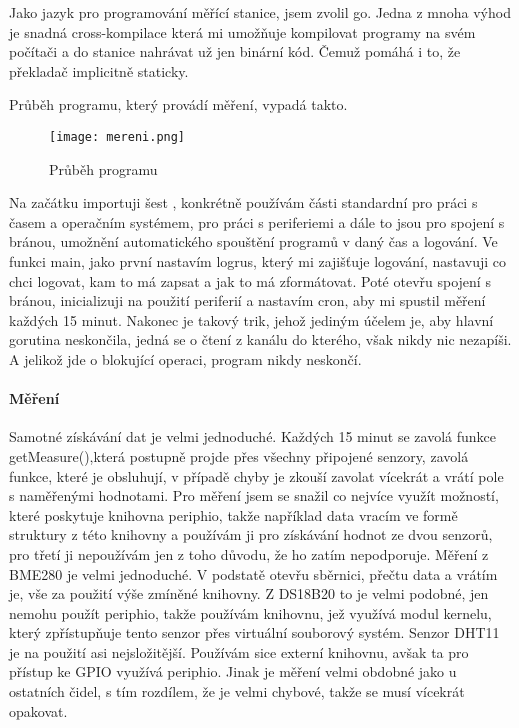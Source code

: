 Jako jazyk pro programování měřící stanice, jsem zvolil \gls{go}. Jedna z mnoha výhod je snadná \gls{cross-kompilace} 
která mi umožňuje kompilovat programy na svém počítači a do stanice nahrávat už jen binární kód. Čemuž pomáhá i to, že 
překladač implicitně  staticky.

Průběh programu, který provádí měření, vypadá takto.

\begin{figure}[H]
    \centering
    \texttt{[image: mereni.png]}
    \caption{Průběh programu}
\end{figure}

Na začátku importuji šest , konkrétně používám části standardní  
pro práci s časem a operačním systémem,  pro práci s periferiemi a dále to jsou 
 pro spojení s bránou, umožnění automatického spouštění programů v daný čas a logování. Ve 
funkci main, jako první nastavím  logrus, který mi zajišťuje logování, nastavuji co chci 
logovat, kam to má zapsat a jak to má zformátovat. Poté otevřu spojení s bránou, inicializuji 
 na použití periferií a nastavím cron, aby mi spustil měření každých 15 minut. Nakonec je 
takový trik, jehož jediným účelem je, aby hlavní gorutina neskončila, jedná se o čtení z kanálu do kterého, však nikdy 
nic nezapíši. A jelikož jde o blokující operaci, program nikdy neskončí.

\paragraph*{Měření}
Samotné získávání dat je velmi jednoduché. Každých 15 minut se zavolá funkce getMeasure(),která postupně projde přes 
všechny připojené senzory, zavolá funkce, které je obsluhují, v případě chyby je zkouší zavolat vícekrát a vrátí pole 
s naměřenými hodnotami. Pro měření jsem se snažil co nejvíce využít možností, které poskytuje  \gls{knihovna} 
\gls{periphio}, takže například data vracím ve formě struktury z této knihovny a používám ji pro získávání hodnot ze 
dvou senzorů, pro třetí ji nepoužívám jen z toho důvodu, že ho zatím nepodporuje. Měření z BME280 je velmi jednoduché. 
V podstatě otevřu sběrnici, přečtu data a vrátím je, vše za použití výše zmíněné knihovny. Z DS18B20 to je velmi podobné, 
jen nemohu použít \gls{periphio}, takže používám knihovnu, jež využívá modul kernelu, který zpřístupňuje tento senzor 
přes virtuální souborový systém. Senzor DHT11 je na použití asi nejsložitější. Používám sice externí knihovnu, avšak ta 
pro přístup ke GPIO využívá \gls{periphio}. Jinak je měření velmi obdobné jako u ostatních čidel, s tím rozdílem, že je 
velmi chybové, takže se musí vícekrát opakovat.

